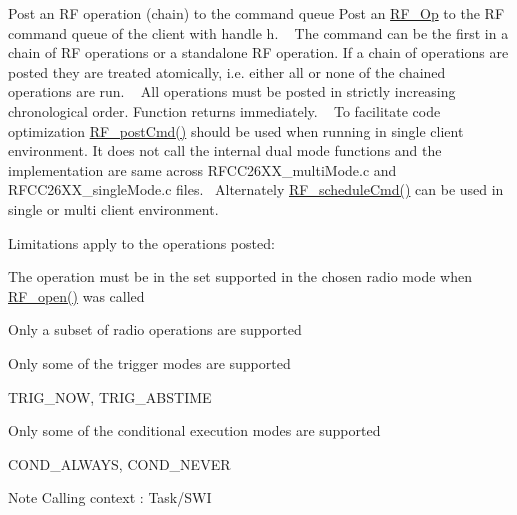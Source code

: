 Post an R\+F operation (chain) to the command queue Post an \hyperlink{_r_f_8h_a47ea3dea78019340e8f8ceb854de5f02}{R\+F\+\_\+\+Op} to the R\+F command queue of the client with handle h. ~\newline
 The command can be the first in a chain of R\+F operations or a standalone R\+F operation. If a chain of operations are posted they are treated atomically, i.\+e. either all or none of the chained operations are run. ~\newline
 All operations must be posted in strictly increasing chronological order. Function returns immediately. ~\newline
 To facilitate code optimization \hyperlink{_r_f_8h_a2b0ee444fcb74917df94eefea804ecbb}{R\+F\+\_\+post\+Cmd()} should be used when running in single client environment. It does not call the internal dual mode functions and the implementation are same across R\+F\+C\+C26\+X\+X\+\_\+multi\+Mode.\+c and R\+F\+C\+C26\+X\+X\+\_\+single\+Mode.\+c files.~\newline
 Alternately \hyperlink{_r_f_8h_a5e7f25943b5f3942bf4c09cb87f9aa76}{R\+F\+\_\+schedule\+Cmd()} can be used in single or multi client environment. ~\newline
 

Limitations apply to the operations posted\+:
\begin{DoxyItemize}
\item The operation must be in the set supported in the chosen radio mode when \hyperlink{_r_f_8h_a13a7c6f5a2b797e0aac18fecfaba6f64}{R\+F\+\_\+open()} was called
\item Only a subset of radio operations are supported
\item Only some of the trigger modes are supported
\begin{DoxyItemize}
\item T\+R\+I\+G\+\_\+\+N\+O\+W, T\+R\+I\+G\+\_\+\+A\+B\+S\+T\+I\+M\+E
\end{DoxyItemize}
\item Only some of the conditional execution modes are supported
\begin{DoxyItemize}
\item C\+O\+N\+D\+\_\+\+A\+L\+W\+A\+Y\+S, C\+O\+N\+D\+\_\+\+N\+E\+V\+E\+R
\end{DoxyItemize}
\end{DoxyItemize}

\begin{DoxyNote}{Note}
Calling context \+: Task/\+S\+W\+I
\end{DoxyNote}


